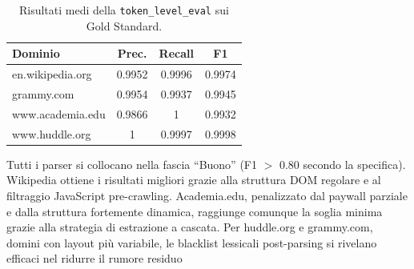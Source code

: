\documentclass[11pt]{article}
\begin{document}
\begin{table}[h]
\centering
\small
\begin{tabular}{lccc}
\toprule
\textbf{Dominio} & \textbf{Prec.} & \textbf{Recall} & \textbf{F1} \\
\midrule
en.wikipedia.org  & 0.9952 & 0.9996 & 0.9974 \\
grammy.com        & 0.9954 & 0.9937 & 0.9945 \\
www.academia.edu  & 0.9866 & 1 & 0.9932 \\
www.huddle.org    & 1 & 0.9997 & 0.9998 \\
\bottomrule
\end{tabular}
\caption{Risultati medi della \texttt{token\_level\_eval} sui Gold Standard.}
\label{tab:results}
\end{table}

Tutti i parser si collocano nella fascia ``Buono'' (F1 $>$ 0.80 secondo la specifica). Wikipedia ottiene i risultati migliori grazie alla struttura DOM regolare e al filtraggio JavaScript pre-crawling. Academia.edu, penalizzato dal paywall parziale e dalla struttura fortemente dinamica, raggiunge comunque la soglia minima grazie alla strategia di estrazione a cascata. Per huddle.org e grammy.com, domini con layout più variabile, le blacklist lessicali post-parsing si rivelano efficaci nel ridurre il rumore residuo
\end{document}
